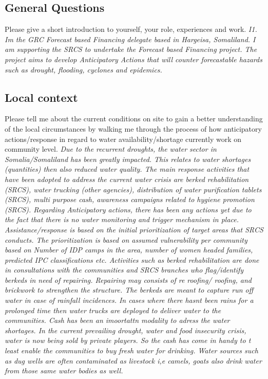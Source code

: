 \subsection*{General Questions}
Please give a short introduction to yourself, your role, experiences and work.
\textit{I1. Im the GRC Forecast based Financing delegate based in Hargeisa, Somaliland. I am supporting the SRCS to undertake the Forecast based Financing project. The project aims to develop Anticipatory Actions that will counter forecastable hazards such as drought, flooding, cyclones and epidemics.}

\subsection*{Local context}
Please tell me about the current conditions on site to gain a better understanding of the local circumstances by walking me through the process of how anticipatory actions/response in regard to water availability/shortage currently work on community level.\newline
\textit{Due to the recurrent droughts, the water sector in Somalia/Somaliland has been greatly impacted. This relates to water shortages (quantities) then also reduced water quality. The main response activities that have been adopted to address the current water crisis are berked rehabilitation (SRCS), water trucking (other agencies), distribution of water purification tablets (SRCS), multi purpose cash, awareness campaigns related to hygiene promotion (SRCS). Regarding Anticipatory actions, there has been any actions yet due to the fact that there is no water monitoring and trigger mechanism in place. Assistance/response is based on the initial prioritization of target areas that SRCS conducts. The prioritization is based on assumed vulnerability per community based on Number of IDP camps in the area, number of women headed families, predicted IPC classifications etc. Activities such as berked rehabilitation are done in consultations with the communities and SRCS branches who flag/identify berkeds in need of repairing. Repairing may consists of re roofing/ roofing, and brickwork to strengthen the structure. The berkeds are meant to capture run off water in case of rainfall incidences. In cases where there hasnt been rains for a prolonged time then water trucks are deployed to deliver water to the communities. Cash has been an imoortattn modality to adress the water shortages. In the current prevailing drought, water and food insecurity crisis, water is now being sold by private players. So the cash has come in handy to t least enable the communities to buy fresh water for drinking. Water sources such as dug wells are often contaminated as livestock i,e camels, goats also drink water from those same water bodies as well.}

